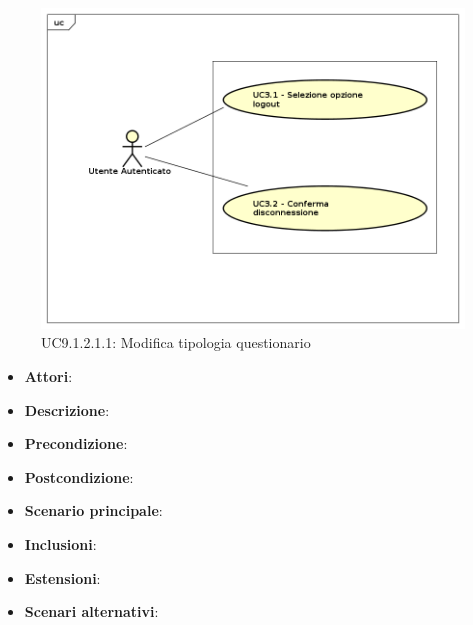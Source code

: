 					\label{UC9.1.2.1.1}
					\begin{figure}[h]
						\centering
					\includegraphics[scale=0.7,keepaspectratio]{UML/UC9.png}
						\caption{UC9.1.2.1.1: Modifica tipologia questionario}
					\end{figure}
					\FloatBarrier
					\begin{itemize}
						\item \textbf{Attori}: 
						\item \textbf{Descrizione}: 
						\item \textbf{Precondizione}: 
						\item \textbf{Postcondizione}: 
						\item \textbf{Scenario principale}:
						\item \textbf{Inclusioni}:
						\item \textbf{Estensioni}:
						\item \textbf{Scenari alternativi}:
					\end{itemize}
					
